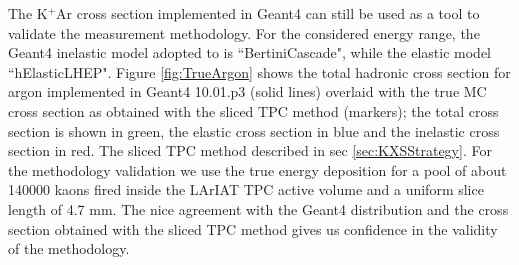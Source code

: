 The K$^{+}$Ar cross section implemented in Geant4 can still be used as a tool to validate the measurement methodology. For the considered energy range, the Geant4 inelastic model adopted to is ``BertiniCascade", while the elastic model ``hElasticLHEP".  Figure \ref{fig:TrueArgon} shows the total hadronic cross section for argon implemented in Geant4 10.01.p3 (solid lines) overlaid with the true MC cross section as obtained with the sliced TPC method (markers); the total cross section is shown in green,  the elastic cross section in blue and the inelastic cross section in red. The sliced TPC method described in sec \ref{sec:KXSStrategy}. For the methodology validation we use the true energy deposition for a pool of about 140000 kaons fired inside the LArIAT TPC active volume and a uniform slice length of 4.7 mm.  The nice agreement with the Geant4 distribution and the cross section  obtained with the sliced TPC method gives us confidence in the  validity of the methodology. 
        

